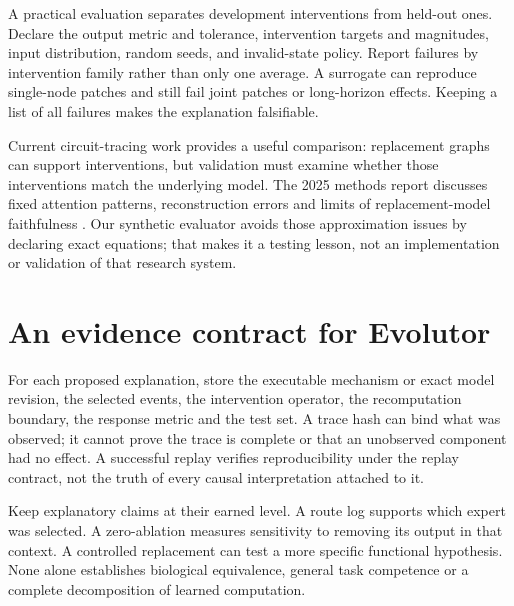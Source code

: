 
A practical evaluation separates development interventions from held-out ones.
Declare the output metric and tolerance, intervention targets and magnitudes,
input distribution, random seeds, and invalid-state policy. Report failures
by intervention family rather than only one average. A surrogate can reproduce
single-node patches and still fail joint patches or long-horizon effects.
Keeping a list of all failures makes the explanation falsifiable.

Current circuit-tracing work provides a useful comparison: replacement graphs
can support interventions, but validation must examine whether those
interventions match the underlying model. The 2025 methods report discusses
fixed attention patterns, reconstruction errors and limits of replacement-model
faithfulness \cite{circuits}. Our synthetic evaluator avoids those approximation
issues by declaring exact equations; that makes it a testing lesson, not an
implementation or validation of that research system.

\section{An evidence contract for Evolutor}
For each proposed explanation, store the executable mechanism or exact model
revision, the selected events, the intervention operator, the recomputation
boundary, the response metric and the test set. A trace hash can bind what
was observed; it cannot prove the trace is complete or that an unobserved
component had no effect. A successful replay verifies reproducibility under
the replay contract, not the truth of every causal interpretation attached to it.

Keep explanatory claims at their earned level. A route log supports which
expert was selected. A zero-ablation measures sensitivity to removing its
output in that context. A controlled replacement can test a more specific
functional hypothesis. None alone establishes biological equivalence,
general task competence or a complete decomposition of learned computation.

